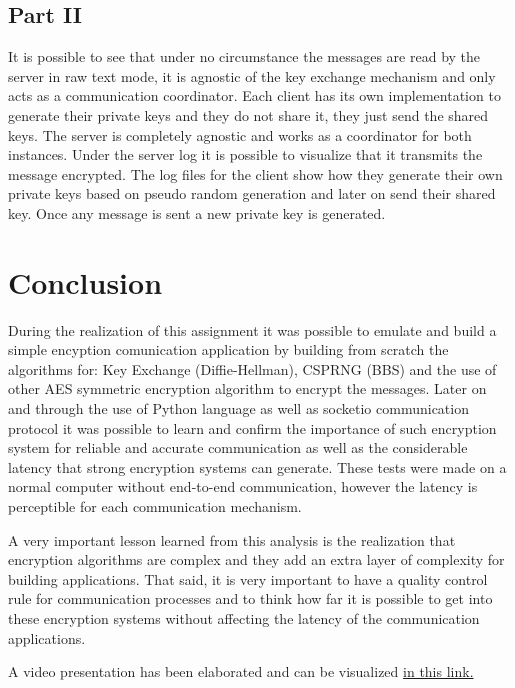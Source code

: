 \documentclass[letterpaper,12pt]{article}
\begin{document}
\subsection{Part II}
It is possible to see that under no circumstance the messages are read by the server in raw text mode, it is agnostic of the key exchange mechanism and only acts as a communication coordinator.
Each client has its own implementation to generate their private keys and they do not share it, they just send the shared keys. The server is completely agnostic and works as a coordinator for both instances. Under the server log it is possible to visualize that it transmits the message encrypted.
The log files for the client show how they generate their own private keys based on pseudo random generation and later on send their shared key. Once any message is sent a new private key is generated.
\section{Conclusion}
During the realization of this assignment it was possible to emulate and build a simple encyption comunication application by building from scratch the algorithms for: Key Exchange (Diffie-Hellman), CSPRNG (BBS) and the use of other AES symmetric encryption algorithm to encrypt the messages.
Later on and through the use of Python language as well as socketio communication protocol it was possible to learn and confirm the importance of such encryption system for reliable and accurate communication as well as the considerable latency that strong encryption systems can generate. 
These tests were made on a normal computer without end-to-end communication, however the latency is perceptible for each communication mechanism. 

A very important lesson learned from this analysis is the realization that encryption algorithms are complex and they add an extra layer of complexity for building applications. That said, it is very important to have a quality control rule for communication processes and to think how far it is possible to get into these encryption systems without affecting the latency of the communication applications.

A video presentation has been elaborated and can be visualized \href{https://youtu.be/cKevoex-4h8}{in this link.}



\end{document}
